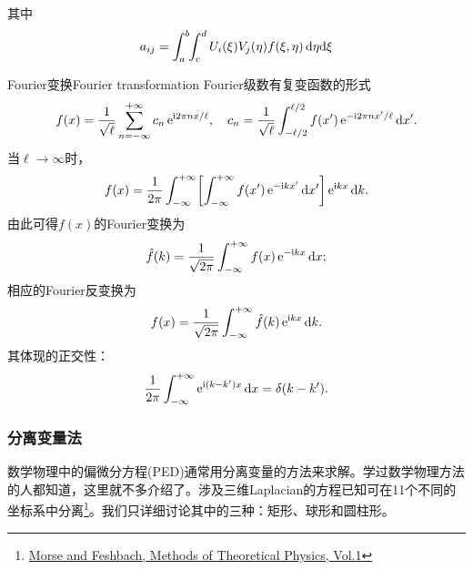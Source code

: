 其中 
\[
    a_{ij}=\int_a^b\bs3\int_c^dU_i(\xi)V_j(\eta)f(\xi,\eta)\d\eta\nd\xi
\]
\begin{example}{Fourier变换}{Fourier transformation}
    Fourier级数有复变函数的形式
    \[
        f(x)=\frac1{\sqrt\ell}\sum_{n=-\infty}^{+\infty}c_n\e{\i2\pi nx/\ell},\quad c_n=\frac1{\sqrt\ell}\int_{-\ell/2}^{\ell/2}f(x')\e{-\i2\pi nx'/\ell}\d x'.
    \]
    当$\ell\to\infty$时，
    \[
        f(x)=\frac1{2\pi}\int\iti\biggfkh{\int\iti f(x')\e{-\i kx'}\d x'}\e{\i kx}\d k.
    \]
    由此可得$f(x)$的Fourier变换为
    \begin{equation}
        \hat f(k)=\frac1{\sqrt{2\pi}}\int\iti f(x)\e{-\i kx}\d x;
    \end{equation}
    相应的Fourier反变换为
    \begin{equation}
        f(x)=\frac1{\sqrt{2\pi}}\int\iti\hat f(k)\e{\i kx}\d k.
    \end{equation}
    其体现的正交性：
    \[
        \frac1{2\pi}\int\iti\e{\i(k-k')x}\d x=\delta(k-k').
    \]
\end{example}
\subsubsection{分离变量法}
数学物理中的偏微分方程(PED)通常用分离变量的方法来求解。学过数学物理方法的人都知道，这里就不多介绍了。涉及三维Laplacian的方程已知可在11个不同的坐标系中分离\footnote{\href{https://www.researchgate.net/publication/316991519_Morse_and_Feshbach's_Methods_of_Theoretical_Physics_Vol1_Morse_and_Feshbach_1953}{Morse and Feshbach, Methods of Theoretical Physics, Vol.1}}。我们只详细讨论其中的三种：矩形、球形和圆柱形。

